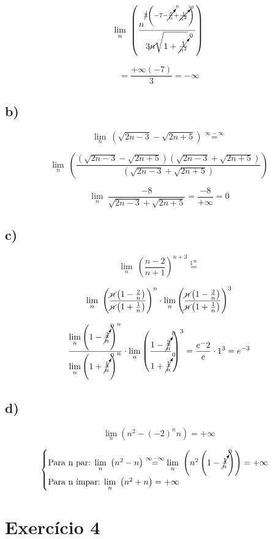 \documentclass[a4paper]{article}
\begin{document}
\[\lim\limits_{n}\ \left(\frac{n^{\cancel{3}\left(-7-\cancelto{0}{\frac{5}{n}}+\cancelto{0}{\frac{1}{n^2}}\right)}}{3\cancel{n}\sqrt{1+\cancelto{0}{\frac{1}{n^2}}}}\right)\]

\[= \frac{+\infty\left(-7\right)}{3}=-\infty\]

\subsection*{b)}
\[\lim\limits_{n}\ \left(\sqrt{2n-3}-\sqrt{2n+5}\right)\overset{\mathrm{\infty-\infty}}{=}\]

\[\lim\limits_{n}\ \left(\frac{\left(\sqrt{2n-3}-\sqrt{2n+5}\right)\left(\sqrt{2n-3}+\sqrt{2n+5}\right)}{\left(\sqrt{2n-3}+\sqrt{2n+5}\right)}\right)\]

\[\lim\limits_{n}\ \frac{-8}{\sqrt{2n-3}+\sqrt{2n+5}} = \frac{-8}{+\infty}=0\]

\subsection*{c)}
\[\lim\limits_{n}\ \left(\frac{n-2}{n+1}\right)^{n+3}\overset{\mathrm{1^{\infty}}}{=}\]

\[\lim\limits_{n}\ \left(\frac{\cancel{n}\left(1-\frac{2}{n}\right)}{\cancel{n}\left(1+\frac{1}{n}\right)}\right)^{n} \cdot \lim\limits_{n}\left(\frac{\cancel{n}\left(1-\frac{2}{n}\right)}{\cancel{n}\left(1+\frac{1}{n}\right)}\right)^{3}\]

\[\frac{\lim\limits_{n}\left(1-\cancelto{0}{\frac{2}{n}}\right)^n}{\lim\limits_{n}\left(1+\cancelto{0}{\frac{1}{n}}\right)^n}\cdot \lim\limits_{n}\left(\frac{1-\cancelto{0}{\frac{2}{n}}}{1+\cancelto{0}{\frac{1}{n}}}\right)^{3}=\frac{e^-2}{e}\cdot 1^3=e^{-3}\]

\subsection*{d)}
\[\lim\limits_{n}\left(n^2-\left(-2\right)^nn\right)=+\infty\]

\[\begin{cases}
	\text{Para n par: $\lim\limits_{n}\ \left(n^2-n\right)\overset{\mathrm{\infty-\infty}}{=} \lim\limits_{n}\ \left(n^2\left(1-\cancelto{0}{\frac{1}{n}}\right)\right)=+\infty$}\\ 
	\text{Para n ímpar: $\lim\limits_{n}\ \left(n^2+n\right) = +\infty$}
\end{cases}\]

\section*{Exercício 4}
\end{document}
